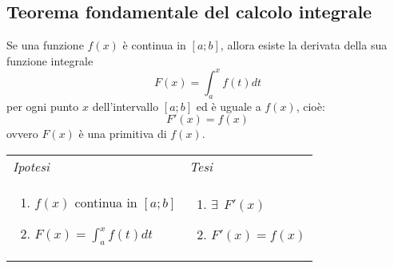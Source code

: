 \documentclass{article}     %
\begin{document}
    \subsection{Teorema fondamentale del calcolo integrale}
        \begin{shadedTheorem}
            Se una funzione $f(x)$ è continua in $[a;b]$, allora esiste la derivata della sua funzione integrale
            \[F(x)=\int_a^x f(t)dt\]
            per ogni punto $x$ dell'intervallo $[a;b]$ ed è uguale a $f(x)$, cioè:
            \[F'(x)=f(x)\]
            ovvero $F(x)$ è una primitiva di $f(x)$.
        \end{shadedTheorem}
        \begin{tabular}{m{}m{}}
            \textit{Ipotesi} & \textit{Tesi}  \\
            \begin{enumerate}
                \item $f(x)$ continua in $[a;b]$
                \item $F(x)=\int_a^x f(t)dt$
            \end{enumerate} & 
            \begin{enumerate}
                \item $\exists~~ F'(x)$
                \item $F'(x)=f(x)$
            \end{enumerate}
        \end{tabular}
\end{document}
